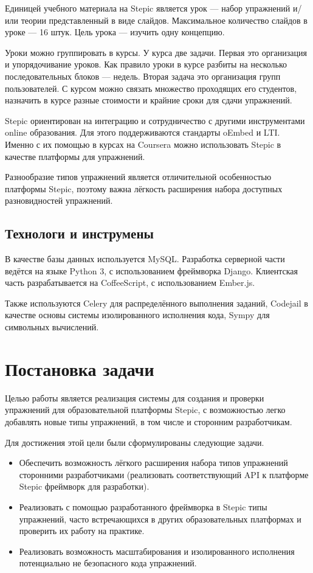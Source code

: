 \documentclass{matmex-diploma-custom}
\begin{document}
Единицей учебного материала на Stepic является урок --- набор упражнений
и/или теории представленный в виде слайдов. Максимальное количество
слайдов в уроке --- 16 штук. Цель урока --- изучить одну концепцию.

Уроки можно группировать в курсы. У курса две задачи. Первая это
организация и упорядочивание уроков. Как правило уроки в курсе разбиты
на несколько последовательных блоков --- недель. Вторая задача это
организация групп пользователей. С курсом можно связать множество
проходящих его студентов, назначить в курсе разные стоимости и крайние
сроки для сдачи упражнений.

Stepic ориентирован на интеграцию и сотрудничество с другими инструментами
online образования. Для этого поддерживаются стандарты oEmbed и
LTI. Именно с их помощью в курсах на Coursera можно использовать
Stepic в качестве платформы для упражнений.

Разнообразие типов упражнений является отличительной особенностью
платформы Stepic, поэтому важна лёгкость расширения набора доступных
разновидностей упражнений.

\subsection{Технологи и инструмены}
В качестве базы данных используется MySQL. Разработка серверной части
ведётся на языке Python 3, с использованием фреймворка
Django. Клиентская часть разрабатывается на CoffeeScript, с
использованием Ember.js.

Также используются Celery для распределённого выполнения заданий,
Codejail в качестве основы системы изолированного исполнения кода,
Sympy для символьных вычислений.

\section{Постановка задачи}
Целью работы является реализация системы для создания и проверки
упражнений для образовательной платформы Stepic, с возможностью легко
добавлять новые типы упражнений, в том числе и сторонним
разработчикам.

Для достижения этой цели были сформулированы следующие задачи.

\begin{itemize}
\item Обеспечить возможность лёгкого расширения набора типов
  упражнений сторонними разработчиками (реализовать соответствующий
  API к платформе Stepic фреймворк для разработки).
\item Реализовать с помощью разработанного фреймворка в Stepic типы
  упражнений, часто встречающихся в других образовательных платформах
  и проверить их работу на практике.
\item Реализовать возможность масштабирования и изолированного
  исполнения потенциально не безопасного кода упражнений.
\end{itemize}
\end{document}
